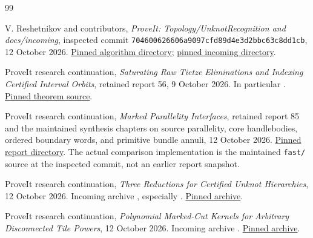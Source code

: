 \begin{thebibliography}{99}
\raggedright

V. Reshetnikov and contributors,
\emph{ProveIt: Topology/UnknotRecognition and docs/incoming},
inspected commit \texttt{704600626606a9097cfd89d4e3d2bbc63c8dd1cb},
12 October 2026.
\href{https://github.com/VladimirReshetnikov/ProveIt/tree/704600626606a9097cfd89d4e3d2bbc63c8dd1cb/Topology/UnknotRecognition}{Pinned algorithm directory};
\href{https://github.com/VladimirReshetnikov/ProveIt/tree/704600626606a9097cfd89d4e3d2bbc63c8dd1cb/docs/incoming}{pinned incoming directory}.

ProveIt research continuation,
\emph{Saturating Raw Tietze Eliminations and Indexing Certified Interval
Orbits}, retained report 56, 9 October 2026.
In particular .
\href{https://github.com/VladimirReshetnikov/ProveIt/blob/704600626606a9097cfd89d4e3d2bbc63c8dd1cb/Topology/UnknotRecognition/reports/56/article/raw_epoch.tex}{Pinned theorem source}.

ProveIt research continuation,
\emph{Marked Parallelity Interfaces}, retained report 85 and the maintained
synthesis chapters on source parallelity, core handlebodies, ordered
boundary words, and primitive bundle annuli, 12 October 2026.
\href{https://github.com/VladimirReshetnikov/ProveIt/tree/704600626606a9097cfd89d4e3d2bbc63c8dd1cb/Topology/UnknotRecognition/reports/85}{Pinned report directory}.
The actual comparison implementation is the maintained \texttt{fast/}
source at the inspected commit, not an earlier report snapshot.

ProveIt research continuation,
\emph{Three Reductions for Certified Unknot Hierarchies},
12 October 2026.  Incoming archive
,
especially .
\href{https://github.com/VladimirReshetnikov/ProveIt/blob/704600626606a9097cfd89d4e3d2bbc63c8dd1cb/docs/incoming/ProveIt_Unknot_Hierarchy_Kernels_2026-10-12.zip}{Pinned archive}.

ProveIt research continuation,
\emph{Polynomial Marked-Cut Kernels for Arbitrary Disconnected Tile Powers},
12 October 2026.  Incoming archive
.
\href{https://github.com/VladimirReshetnikov/ProveIt/blob/704600626606a9097cfd89d4e3d2bbc63c8dd1cb/docs/incoming/ProveIt_Disconnected_Tile_Kernels_2026-10-12.zip}{Pinned archive}.


\end{thebibliography}
